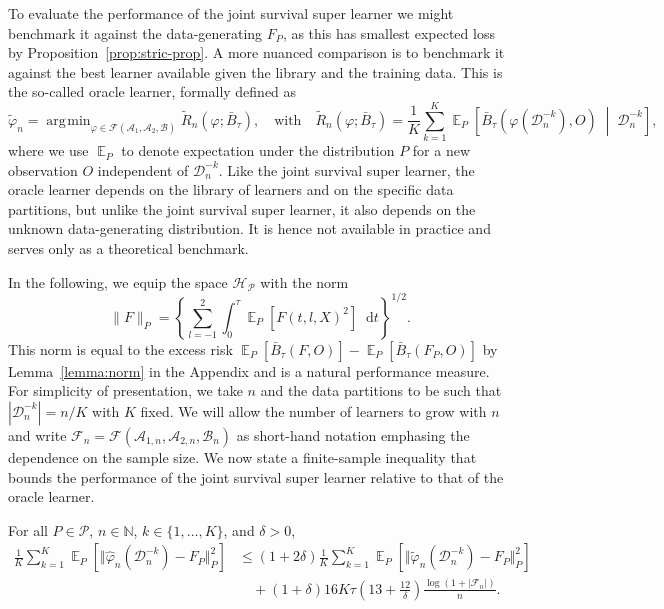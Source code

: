 \documentclass[lineno]{biometrika}
\DeclareMathOperator{\E}{\mathbb{E}} %
\newcommand{\N}{\mathbb{N}}
\renewcommand{\phi}{\varphi}
\newcommand*\diff{\mathop{}\!\mathrm{d}}
\newcommand{\midd}{\; \middle|\;}
\newcommand{\1}{\mathds{1}}
\DeclareMathOperator*{\argmin}{\arg\!\min}
\newcommand{\data}{\ensuremath{\mathcal{D}}}
\begin{document}
To evaluate the performance of the joint survival super learner we
might benchmark it against the data-generating \( F_P \), as this has
smallest expected loss by Proposition~\ref{prop:stric-prop}. A more
nuanced comparison is to benchmark it against the best learner
available given the library and the training data. This is the
so-called oracle learner, formally defined as
\begin{equation*}
  \tilde{\phi}_n
  =  \argmin_{\phi \in \mathcal{F}(\mathcal{A}_1, \mathcal{A}_2, \mathcal{B}) }
  \tilde{R}_{n}(\phi ; \bar{B}_{\tau}),
  \quad \text{with} \quad 
  \tilde{R}_n(\phi; \bar{B}_{\tau})=
  \frac{1}{K}\sum_{k=1}^{K} 
  \E_P{
    \left[
      \bar{B}_{\tau}
      {
        \left(
          \phi{ (\data_n^{-k})}
          , O
        \right)
      } 
      \midd  \data_n^{-k}
    \right]}
  ,
\end{equation*}
where %
we use \( \E_P \) to denote expectation under the distribution \( P \)
for a new observation \( O \) independent of \( \data_n^{-k} \). Like
the joint survival super learner, the oracle learner depends on the library of learners and on the
specific data partitions, but unlike the joint survival super learner, it also depends on the
unknown data-generating distribution. It is hence not available in
practice and serves only as a theoretical benchmark. 

In the following, we equip the space \( \mathcal{H}_{\mathcal{P}} \)
with the norm
\begin{equation}
  \label{eq:norm}
  \| F \|_{P} = 
  \left\{
    \sum_{l=-1}^{2}
    \int_0^{\tau} \E_P{\left[ F(t, l, X)^2 \right]} \diff t
  \right\}^{1/2}.
\end{equation}
This norm is equal to the excess risk
\( \E_P{[\bar{B}_\tau(F, O)]} - \E_P{[\bar{B}_\tau(F_P, O)]} \) by
Lemma~\ref{lemma:norm} in the Appendix and is a natural performance
measure. For simplicity of presentation, we take \( n \) and the data
partitions to be such that \( |\data_n^{-k}| = n/K \) with \( K \)
fixed. We will allow the number of learners to grow with \( n \) and
write
\( \mathcal{F}_n=\mathcal{F}(\mathcal{A}_{1,n}, \mathcal{A}_{2,n},
\mathcal{B}_n)\) as short-hand notation emphasing the dependence on
the sample size. We now state a finite-sample inequality that bounds
the performance of the joint survival super learner relative to that
of the oracle learner.

\begin{proposition}
  \label{prop:oracle-prop}
  For all \(P\in\mathcal{P}\), \( n \in \N \), \( k \in \{1, \dots, K\} \),
  and $\delta>0$,
  \begin{align*}
    \frac{1}{K}\sum_{k=1}^{K} \E_{P}{\left[ \Vert \hat{\phi}_n(\data_n^{-k}) - F_P \Vert_{P}^2 \right]}
    & \leq (1 + 2\delta)
      \frac{1}{K}\sum_{k=1}^{K} \E_{P}{\left[ \Vert \tilde{\phi}_n(\data_n^{-k}) - F_P \Vert_{P}^2 \right]}
    \\
    & \quad
      + (1+ \delta) 16   K \tau
      \left(
      13 + \frac{12}{\delta}
      \right)
      \frac{\log(1 + |\mathcal{F}_n|)}{n}.
  \end{align*}
\end{proposition}
\end{document}
